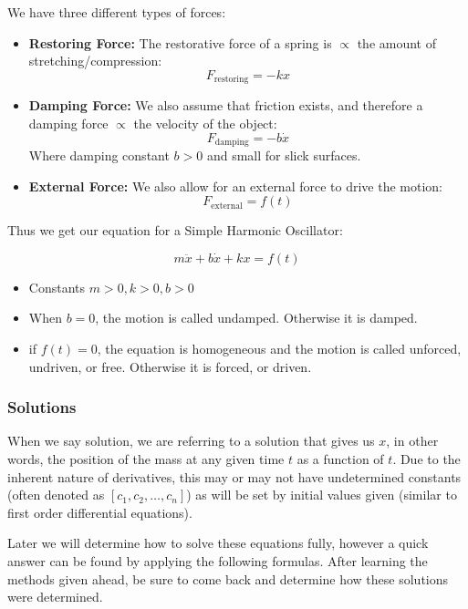         We have three different types of forces:

            \begin{itemize}
                \item \textbf{Restoring Force:} The restorative force of a spring is $\propto$ the amount of stretching/compression:
                    \[ F_{\text{restoring} } = -k x \]
                \item \textbf{Damping Force:} We also assume that friction exists, and therefore a damping force $\propto$ the velocity of the object:
                    \[ F_{\text{damping} } = -b \dot{x} \]
                    Where damping constant $b > 0$ and small for slick surfaces.
                \item \textbf{External Force:} We also allow for an external force to drive the motion:
                    \[ F_{\text{external} } = f(t) \]
            \end{itemize}

        Thus we get our equation for a Simple Harmonic Oscillator:

            \[ m \ddot{x} + b \dot{x} + kx = f(t) \]

            \begin{itemize}
                \item Constants $m>0, k>0, b>0$
                \item When $b=0$, the motion is called undamped. Otherwise it is damped.
                \item if $f(t)=0$, the equation is homogeneous and the motion is called unforced, undriven, or free. Otherwise it is forced, or driven.
            \end{itemize}

        \subsubsection{Solutions}
        When we say solution, we are referring to a solution that gives us $x$, in other words, the position of the mass at any given time $t$ as a function of $t$. Due to the inherent nature of derivatives, this may or may not have undetermined constants (often denoted as $[c_1, c_2, \dots, c_n]$) as will be set by initial values given (similar to first order differential equations).

        Later we will determine how to solve these equations fully, however a quick answer can be found by applying the following formulas. After learning the methods given ahead, be sure to come back and determine how these solutions were determined.

